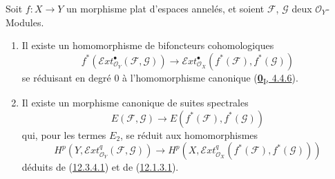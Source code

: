 \begin{proposition}[12.3.4]
\label{0.12.3.4-fr}
Soit $f:X\to Y$ un morphisme \textup{plat} d'espaces annelés, et soient
$\mathcal F$, $\mathcal G$ deux $\mathcal O_Y$-Modules.
\begin{enumerate}
\item[{\rm(i)}] Il existe un homomorphisme de bifoncteurs
cohomologiques
\[
\label{0.12.3.4.1-fr}
\tag{12.3.4.1}
f^*(\mathcal{E}xt_{\mathcal O_Y}^{\bullet}(\mathcal F,\mathcal G))
\longrightarrow
\mathcal{E}xt_{\mathcal O_X}^{\bullet}(f^*(\mathcal F),f^*(\mathcal G))
\]
se réduisant en degré $0$ à l'homomorphisme canonique
(\hyperref[0.4.4.6-fr]{\textbf{0}\textsubscript{I}, 4.4.6}).

\item[{\rm(ii)}] Il existe un morphisme canonique de suites spectrales
\[
\label{0.12.3.4.2-fr}
\tag{12.3.4.2}
E(\mathcal F,\mathcal G)\longrightarrow
E(f^*(\mathcal F),f^*(\mathcal G))
\]
qui, pour les termes $E_2$, se réduit aux homomorphismes
\[
\label{0.12.3.4.3-fr}
\tag{12.3.4.3}
H^p(Y,\mathcal{E}xt_{\mathcal O_Y}^q(\mathcal F,\mathcal G))
\longrightarrow
H^p(X,\mathcal{E}xt_{\mathcal O_X}^q(f^*(\mathcal F),f^*(\mathcal G)))
\]
déduits de (\hyperref[0.12.3.4.1-fr]{12.3.4.1}) et de
(\hyperref[0.12.1.3.1-fr]{12.1.3.1}).
\end{enumerate}
\end{proposition}

